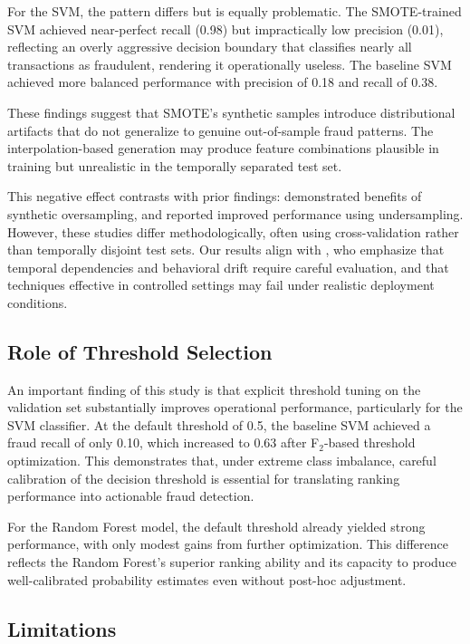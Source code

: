 \documentclass[oneside,12pt,parskip=half,american,numbers=noenddot]{scrreprt}
\begin{document}
For the SVM, the pattern differs but is equally problematic. The SMOTE-trained SVM achieved near-perfect recall (0.98) but impractically low precision (0.01), reflecting an overly aggressive decision boundary that classifies nearly all transactions as fraudulent, rendering it operationally useless. The baseline SVM achieved more balanced performance with precision of 0.18 and recall of 0.38.

These findings suggest that SMOTE's synthetic samples introduce distributional artifacts that do not generalize to genuine out-of-sample fraud patterns. The interpolation-based generation may produce feature combinations plausible in training but unrealistic in the temporally separated test set.

This negative effect contrasts with prior findings: \textcite{chawla_smote_2002} demonstrated benefits of synthetic oversampling, and \textcite{afriyie_supervised_2023} reported improved performance using undersampling. However, these studies differ methodologically, often using cross-validation rather than temporally disjoint test sets. Our results align with \textcite{dal_pozzolo_credit_2015}, who emphasize that temporal dependencies and behavioral drift require careful evaluation, and that techniques effective in controlled settings may fail under realistic deployment conditions.
\subsection{Role of Threshold Selection}

An important finding of this study is that explicit threshold tuning on the validation set substantially improves operational performance, particularly for the SVM classifier. At the default threshold of 0.5, the baseline SVM achieved a fraud recall of only 0.10, which increased to 0.63 after F$_2$-based threshold optimization. This demonstrates that, under extreme class imbalance, careful calibration of the decision threshold is essential for translating ranking performance into actionable fraud detection.

For the Random Forest model, the default threshold already yielded strong performance, with only modest gains from further optimization. This difference reflects the Random Forest's superior ranking ability and its capacity to produce well-calibrated probability estimates even without post-hoc adjustment.

\subsection{Limitations}
\end{document}
